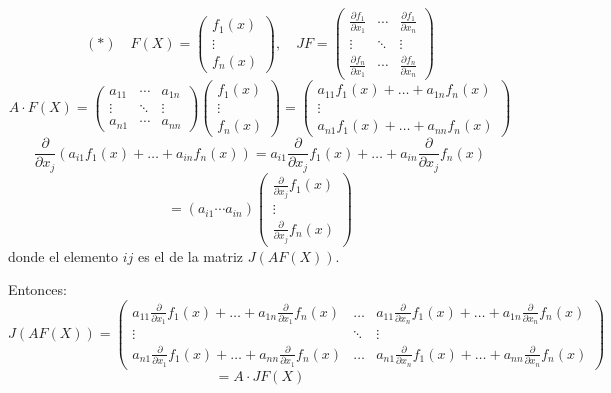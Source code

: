 \documentclass[12pt]{article}
\begin{document}
\begin{ejercicio}[2 puntos]
\begin{enumerate}
          \[
          (*) \quad F(X) = \begin{pmatrix}
          f_1(x)\\
          \vdots \\
          f_n(x)
          \end{pmatrix}, \quad JF = \begin{pmatrix}
          \frac{\partial f_1}{\partial x_1} & \cdots & \frac{\partial f_1}{\partial x_n} \\
          \vdots & \ddots & \vdots \\
          \frac{\partial f_n}{\partial x_1} & \cdots & \frac{\partial f_n}{\partial x_n}
          \end{pmatrix}
          \]
          \[
          A \cdot F(X) = \begin{pmatrix}
          a_{11} & \cdots & a_{1n} \\
          \vdots & \ddots & \vdots \\
          a_{n1} & \cdots & a_{nn}
          \end{pmatrix}
          \begin{pmatrix}
          f_1(x)\\
          \vdots \\
          f_n(x)
          \end{pmatrix}
          = \begin{pmatrix}
          a_{11} f_1(x) + \dots + a_{1n} f_n(x) \\
          \vdots \\
          a_{n1} f_1(x) + \dots + a_{nn} f_n(x)
          \end{pmatrix}
          \]
          \[
          \frac{\partial}{\partial x_j}(a_{i1} f_1(x) + \dots + a_{in} f_n(x))
          = a_{i1} \frac{\partial}{\partial x_j} f_1(x) + \dots + a_{in} \frac{\partial}{\partial x_j} f_n(x)
          \]
          \[
          = (a_{i1} \cdots a_{in}) 
          \begin{pmatrix}
          \frac{\partial}{\partial x_j} f_1(x) \\
          \vdots \\
          \frac{\partial}{\partial x_j} f_n(x)
          \end{pmatrix}
          \]
          donde el elemento $ij$ es el de la matriz $J(A F(X))$.

          Entonces:
          \[
          J(A F(X)) = \begin{pmatrix}
          a_{11} \frac{\partial}{\partial x_1} f_1(x) + \dots + a_{1n} \frac{\partial}{\partial x_1} f_n(x) & \dots & a_{11} \frac{\partial}{\partial x_n} f_1(x) + \dots + a_{1n} \frac{\partial}{\partial x_n} f_n(x) \\
          \vdots & \ddots & \vdots \\
          a_{n1} \frac{\partial}{\partial x_1} f_1(x) + \dots + a_{nn} \frac{\partial}{\partial x_1} f_n(x) & \dots & a_{n1} \frac{\partial}{\partial x_n} f_1(x) + \dots + a_{nn} \frac{\partial}{\partial x_n} f_n(x)
          \end{pmatrix}
          \]
          \[
          = A \cdot JF(X)
          \]


\end{enumerate}
\end{ejercicio}
\end{document}
